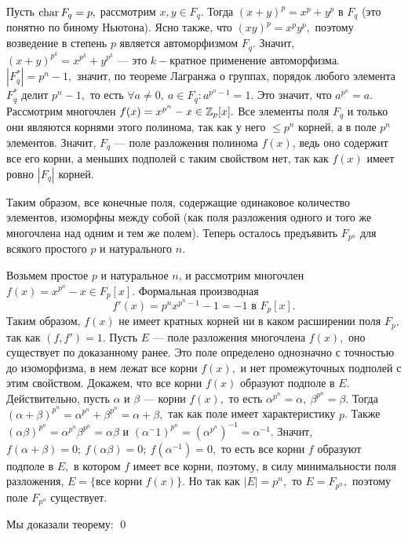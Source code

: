 Пусть ${\rm char\,}F_q=p,$ рассмотрим $x, y\in F_q.$ Тогда $(x+y)^p=x^p+y^p$ в $F_q$ (это понятно по биному Ньютона). Ясно также, что $(xy)^p=x^py^p,$ поэтому
возведение в степень $p$ является автоморфизмом $F_q.$ Значит, $(x+y)^{p^k}=x^{p^k}+y^{p^k}$ --- это $k-$кратное применение автоморфизма.
$|F_q^*|=p^n-1,$ значит, по теореме Лагранжа о группах, порядок любого элемента $F_q^*$ делит $p^n-1,$ то есть $\forall a\ne 0,\ a\in F_q : a^{p^n-1}=1.$ Это значит, что
$a^{p^n}=a.$ Рассмотрим многочлен $f(x)=x^{p^n}-x\in\mathbb Z_p[x].$ Все элементы поля $F_q$ и только они являются корнями этого полинома, так как у него $\le p^n$ корней, а в поле $p^n$ элементов.
Значит, $F_q$ --- поле разложения полинома $f(x)$, ведь оно содержит все его корни, а меньших подполей с таким свойством нет, так как $f(x)$ имеет ровно $|F_q|$ корней.

Таким образом, все конечные поля, содержащие одинаковое количество элементов, изоморфны между собой (как поля разложения одного и того же многочлена над одним и тем же полем).
Теперь осталось предъявить $F_{p^n}$ для всякого простого $p$ и натурального $n$.

Возьмем простое $p$ и натуральное $n$, и рассмотрим многочлен $f(x)=x^{p^n}-x\in F_p[x].$ Формальная производная
$$
f'(x)=p^nx^{p^n-1}-1=-1\mbox{\ \ в\ \ }F_p[x].
$$
Таким образом, $f(x)$ не имеет кратных корней ни в каком расширении поля $F_p,$ так как $(f, f')=1.$
Пусть $E$ --- поле разложения многочлена $f(x),$ оно существует по доказанному ранее. Это поле определено однозначно с точностью до изоморфизма, в нем лежат все корни $f(x),$ и нет промежуточных подполей с этим свойством.
Докажем, что все корни $f(x)$ образуют подполе в $E$. Действительно, пусть $\alpha$ и $\beta$ --- корни $f(x),$ то есть $\alpha^{p^n}=\alpha,\ \beta^{p^n}=\beta.$ Тогда $(\alpha+\beta)^{p^n}=\alpha^{p^n}+\beta^{p^n}=\alpha+\beta,$ так как
поле имеет характеристику $p$. Также $(\alpha\beta)^{p^n}=\alpha^{p^n}\beta^{p^n}=\alpha\beta$ и $(\alpha^-1)^{p^n}=(\alpha^{p^n})^{-1}=\alpha^{-1}.$ Значит,
$f(\alpha+\beta)=0;\ f(\alpha\beta)=0;\ f(\alpha^{-1})=0,$ то есть все корни $f$ образуют подполе в $E,$ в котором $f$ имеет все корни, поэтому, в силу минимальности поля
разложения, $E=\{\mbox{все корни }f(x)\}$. Но так как $|E|=p^n,$ то $E=F_{p^n},$ поэтому поле $F_{p^n}$ существует.

Мы доказали теорему:
\qquad\qed

